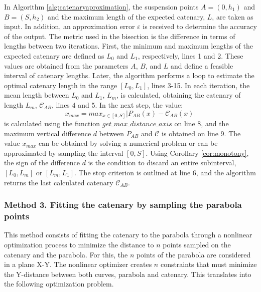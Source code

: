 In Algorithm \ref{alg:catenaryaproximation}, the suspension points $A=(0, h_1)$ and $B=(S, h_2)$ and the maximum length of the expected catenary, $L$, are taken as input. In addition, an approximation error $\varepsilon$ is received to determine the accuracy of the output. The metric used in the bisection is the difference in terms of lengths between two iterations. First, the minimum and maximum lengths of the expected catenary are defined as $L_0$ and $L_1$, respectively, lines 1 and 2. These values are obtained from the parameters $A$, $B$, and $L$ and define a feasible interval of catenary lengths. Later, the algorithm performs a loop to estimate the optimal catenary length in the range $[L_0, L_1]$, lines 3-15. In each iteration, the mean length between $L_0$ and $L_1$, $L_m$, is calculated, obtaining the catenary of length $L_m$, $\mathcal{C}_{AB}$, lines 4 and 5. In the next step, the value: 
\begin{equation}
 x_{max} = max_{x \in [0, S]}|{P_{AB}}(x) - \mathcal{C}_{AB}(x)|   
\end{equation}
\noindent is calculated using the function $get\_max\_distance\_axis$ on line 8, and the maximum vertical difference $d$ between ${P_{AB}}$ and $\mathcal{C}$ is obtained on line 9. The value $x_{max}$ can be obtained by solving a numerical problem or can be approximated by sampling the interval $[0, S]$. Using Corollary \ref{cor:monotony}, the sign of the difference $d$ is the condition to discard an entire subinterval, $[L_0,L_m]$ or $[L_m,L_1]$.
The stop criterion is outlined at line 6, and the algorithm returns the last calculated catenary $\mathcal{C}_{AB}$. 


\subsubsection{Method 3. Fitting the catenary by sampling the parabola points}
\label{sec:bypoints}

This method consists of fitting the catenary to the parabola through a nonlinear optimization process to minimize the distance to $n$ points sampled on the catenary and the parabola. For this, the $n$ points of the parabola are considered in a plane X-Y. The nonlinear optimizer creates $n$ constraints that must minimize the Y-distance between both curves, parabola and catenary. This translates into the following optimization problem.

